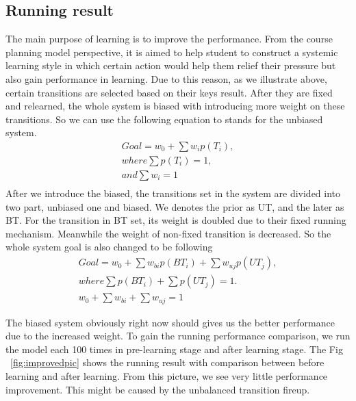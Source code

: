 \documentclass{sig-alternate}
\begin{document}
\subsection{Running result}
The main purpose of learning is to improve the performance. From the course planning model perspective, it is aimed to help student to construct a systemic learning style in which certain action would help them relief their pressure but also gain performance in learning.  Due to this reason, as we illustrate above, certain transitions are selected based on their keys result. After they are fixed and relearned, the whole system is biased with introducing more weight on these transitions.  So we can use the following equation to stands for the unbiased system. 
\begin{eqnarray*}
Goal = w_0+\sum{w_ip(T_i)}, \\
where \sum p(T_i)=1,\\
and \sum w_i=1\\
\end{eqnarray*}
After we introduce the biased, the transitions set in the system are divided into two part, unbiased one and biased. We denotes the prior as UT, and the later as BT.  For the transition in BT set, its weight is doubled due to their fixed running mechanism. Meanwhile the weight of non-fixed transition is decreased. So the whole system goal is also changed to be following
\begin{eqnarray*}
Goal = w_0+\sum{w_{bi}p(BT_i)}+\sum{w_{uj}p(UT_j)}, \\
where \sum p(BT_i)+\sum p(UT_j)=1.\\
w_0+\sum w_{bi} +\sum w_{uj} =1
\end{eqnarray*}

The biased system obviously right now should gives us the better performance due to the increased weight. To gain the running performance comparison, we run the model each 100 times in pre-learning stage and after learning stage.  The Fig ~\ref{fig:improvedpic} shows the running result with comparison between before learning and after learning.  From this picture, we see very little performance improvement.  This might be caused by the unbalanced transition fireup. 
\end{document}
